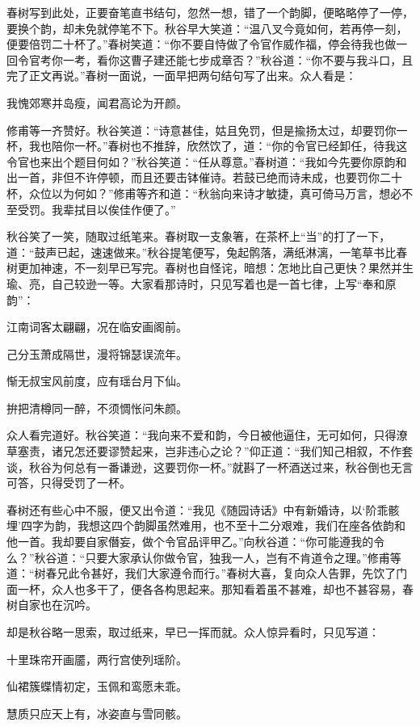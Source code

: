 \documentclass[12pt,UTF8]{ctexbook}
\begin{document}
{{{春树写到此处，正要奋笔直书结句，忽然一想，错了一个韵脚，便略略停了一停，要换个韵，却未免就停笔不下。秋谷早大笑道：“温八叉今竟如何，若再停一刻，便要倍罚二十杯了。”春树笑道：“你不要自恃做了令官作威作福，停会待我也做一回令官考你一考，看你这曹子建还能七步成章否？”秋谷道：“你不要与我斗口，且完了正文再说。”春树一面说，一面早把两句结句写了出来。众人看是：

我愧郊寒并岛瘦，闻君高论为开颜。

修甫等一齐赞好。秋谷笑道：“诗意甚佳，姑且免罚，但是揄扬太过，却要罚你一杯，我也陪你一杯。”春树也不推辞，欣然饮了，道：“你的令官已经卸任，待我这令官也来出个题目何如？”秋谷笑道：“任从尊意。”春树道：“我如今先要你原韵和出一首，非但不许停顿，而且还要击钵催诗。若鼓已绝而诗未成，也要罚你二十杯，众位以为何如？”修甫等齐和道：“秋翁向来诗才敏捷，真可倚马万言，想必不至受罚。我辈拭目以俟佳作便了。”

秋谷笑了一笑，随取过纸笔来。春树取一支象箸，在茶杯上“当”的打了一下，道：“鼓声已起，速速做来。”秋谷提笔便写，兔起鹘落，满纸淋漓，一笔草书比春树更加神速，不一刻早已写完。春树也自怪诧，暗想：怎地比自己更快？果然并生瑜、亮，自己较逊一等。大家看那诗时，只见写着也是一首七律，上写“奉和原韵”：

江南词客太翩翩，况在临安画阁前。

己分玉萧成隔世，漫将锦瑟误流年。

惭无叔宝风前度，应有瑶台月下仙。

拚把清樽同一醉，不须惆怅问朱颜。

众人看完道好。秋谷笑道：“我向来不爱和韵，今日被他逼住，无可如何，只得潦草塞责，诸兄怎还要谬赞起来，岂非违心之论？”仰正道：“我们知己相叙，不作套谈，秋谷为何总有一番谦逊，这要罚你一杯。”就斟了一杯酒送过来，秋谷倒也无言可答，只得受罚了一杯。

春树还有些心中不服，便又出令道：“我见《随园诗话》中有新婚诗，以‘阶乖骸埋’四字为韵，我想这四个韵脚虽然难用，也不至十二分艰难，我们在座各依韵和他一首。我却要自家僭妄，做个令官品评甲乙。”向秋谷道：“你可能遵我的令么？”秋谷道：“只要大家承认你做令官，独我一人，岂有不肯道令之理。”修甫等道：“树春兄此令甚好，我们大家遵令而行。”春树大喜，复向众人告罪，先饮了门面一杯，众人也多干了，便各各构思起来。那知看着虽不甚难，却也不甚容易，春树自家也在沉吟。

却是秋谷略一思索，取过纸来，早已一挥而就。众人惊异看时，只见写道：

十里珠帘开画靥，两行宫使列瑶阶。

仙裙簇蝶情初定，玉佩和鸾愿未乖。

慧质只应天上有，冰姿直与雪同骸。

}}}
\end{document}
